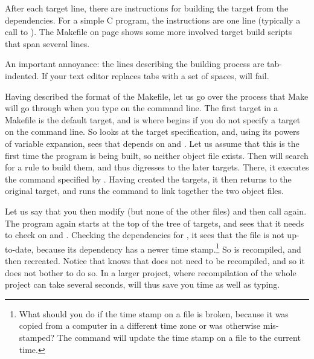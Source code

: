 After each target line, there are instructions for building the target
from the dependencies. For a simple C program, the instructions are one
line (typically a call to ). The Makefile on page
\pageref{latexmake} shows some more involved target build scripts that
span several lines. 

An important annoyance: the lines describing the building
process are tab-indented. If your text editor replaces tabs with a set
of spaces,  will fail.

Having described the format of the Makefile, let us go over the process
that Make will go through when you type  on the command line.
The first target in a Makefile is the default target, and is where
 begins if you do not specify a target on the command line. So
 looks at the target specification, and, using its powers of
variable expansion, sees that  depends on  and
. Let us assume that this is the first time the program is
being built, so neither object file exists. Then  will search
for a rule to build them, and thus digresses to the later targets.
There, it executes the command specified by .
Having created the targets, it then returns to the original target, and
runs the command to link together the two object files. 

Let us say that you then modify  (but none of the other
files) and then call  again. The program again starts at the
top of the tree of targets, and sees that it needs to check on
 and . Checking the dependencies for
, it sees that the file is not up-to-date, because its
dependency has a newer time stamp.\footnote{What should you do if the
time stamp on a file is broken, because it was copied from a computer in
a different time zone or was otherwise mis-stamped? The 
command will update the time stamp on a file to the current time.}
So  is recompiled, and  then recreated. Notice
that  knows that  does not need to be recompiled,
and so it does not bother to do so. In a larger project, where
recompilation of the whole project can take several seconds, 
will thus save you time as well as typing.



